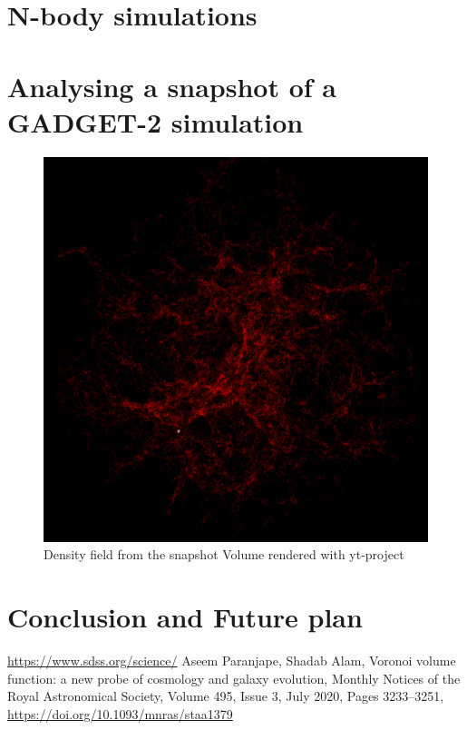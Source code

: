 \documentclass[12pt]{article}
\begin{document}


\section{N-body simulations}

%


\section{Analysing a snapshot of a GADGET-2 simulation}
\cite{aseem_shadab}

\begin{figure}[H]
	\centering
	\includegraphics[width=0.5\linewidth]{../density_assign/UniformGridData_Render_density}
	\caption{Density field from the snapshot \quad
		 Volume rendered with yt-project}
	\label{fig:uniformgriddatarenderdensity}
\end{figure}


\section{Conclusion and Future plan}




\begin{thebibliography}{widest entry}
 \url{https://www.sdss.org/science/}
 Aseem Paranjape, Shadab Alam, Voronoi volume function: a new probe of cosmology and galaxy evolution, Monthly Notices of the Royal Astronomical Society, Volume 495, Issue 3, July 2020, Pages 3233–3251, \url{https://doi.org/10.1093/mnras/staa1379}
\end{thebibliography}
\end{document}
